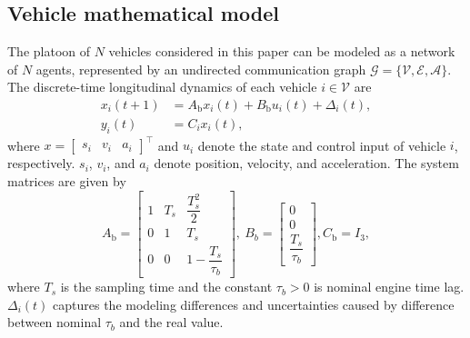 \documentclass{ifacconf}
\def\V{\mathcal{V}} %
\begin{document}
\subsection{Vehicle mathematical model}\label{sec_vehiclemodel}
\vspace*{-0.3cm}
The platoon of $N$ vehicles considered in this paper can be modeled as a network of $N$ agents, represented by an undirected communication graph $\mathcal{G} = \{\mathcal{V}, \mathcal{E}, \mathcal{A}\}$.
The discrete-time longitudinal dynamics of each vehicle $i \in \V$ are
\begin{equation}\label{v_i}
    \begin{aligned}
        x_i(t+1) &= A_{\text{b}} x_i(t) + B_{\text{b}}u_{i}(t) + \Delta_i(t),\\
        y_i(t) &= C_{i} x_i(t),
    \end{aligned} 
\end{equation}
where $x=\begin{bmatrix} s_i & v_i & a_i \end{bmatrix}^{\top}$ and $u_i$ denote the state and control input of vehicle $i$, respectively. $s_i$, $v_i$, and $a_i$ denote position, velocity, and acceleration. The system matrices are given by 
\begin{equation*}
    A_{\text{b}}  =\begin{bmatrix}
    1 & T_s & \dfrac{T^2_s}{2} \\
    0 & 1 & T_s \\
    0 &  0 & 1 - \dfrac{T_s}{\tau_b}
        \end{bmatrix}, \
    B_{b} =\begin{bmatrix}
    0 \\
    0 \\
    \dfrac{T_s}{\tau_b}
        \end{bmatrix}, 
    C_{\text{b}} = I_{3}, 
\end{equation*}
where $T_s$ is the sampling time and the constant $\tau_b>0$ is nominal engine time lag. $\Delta_i(t)$ captures the modeling differences and uncertainties caused by difference between nominal $\tau_b$ and the real value. 
\end{document}
